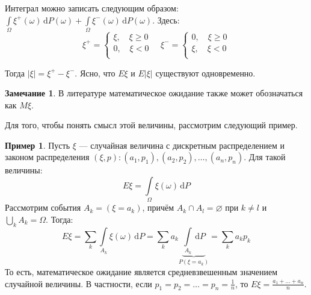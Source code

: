 \documentclass[11pt,openany,a4paper]{scrartcl}
\theoremstyle{plain}
\theoremstyle{definition}
\newtheorem{remark}[theorem]{Замечание}
\newtheorem{example}[theorem]{Пример}
\newcommand{\dif}{\, \mathrm d}
\begin{document}
Интеграл можно записать следующим образом:
$\int\limits_\Omega \xi^+ (\omega) \dif P(\omega) + \int\limits_\Omega
\xi^-(\omega)\dif P(\omega)$. Здесь:
$$
\xi^+ =
\begin{cases}
    \xi,\quad \xi \geqslant 0 \\
    0,\quad \xi < 0 \\
\end{cases}
\quad
\xi^- =
\begin{cases}
    0,\quad \xi \geqslant 0 \\
    \xi,\quad \xi < 0 \\
\end{cases}
$$

Тогда $|\xi| = \xi^+ - \xi^-$. Ясно, что $E\xi$ и $E|\xi|$ существуют 
одновременно.

\begin{remark}
    В литературе математическое ожидание также может обозначаться как $M\xi$.
\end{remark}

Для того, чтобы понять смысл этой величины, рассмотрим следующий пример.

\begin{example}
    Пусть $\xi$ — случайная величина с дискретным распределением и законом 
    распределения $(\xi, p): (a_1, p_1), (a_2, p_2), \ldots, (a_n, p_n)$.
    Для такой величины:
    $$
    E\xi = \int\limits_\Omega \xi(\omega) \dif P
    $$
    Рассмотрим события $A_k = (\xi = a_k)$, причём $A_k \cap A_l = \varnothing$ 
    при $k \neq l$ и $\bigcup\limits_k A_k = \Omega$. Тогда:
    $$
    E\xi = \sum\limits_k \int\limits_{A_k} \xi(\omega) \dif P =
    \sum\limits_k a_k \underbrace{\int\limits_{A_k} \dif P}_{P(\xi = a_k)} = \sum\limits_k a_kp_k
    $$
    То есть, математическое ожидание является средневзвешенным значением случайной
    величины.
    В частности, если $p_1 = p_2 = \ldots = p_n = \frac{1}{n}$, то
    $E\xi = \frac{a_1 + \ldots + a_n}{n}$.
\end{example}
\end{document}
